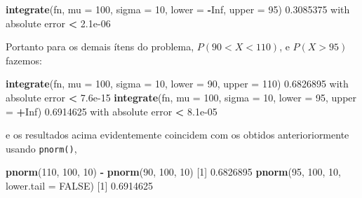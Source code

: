 \documentclass[10pt,a4paper]{book}
\newenvironment{Shaded}{\begin{snugshade}}{\end{snugshade}}
\newcommand{\KeywordTok}[1]{\textcolor[rgb]{0.13,0.29,0.53}{\textbf{#1}}}
\newcommand{\DataTypeTok}[1]{\textcolor[rgb]{0.13,0.29,0.53}{#1}}
\newcommand{\DecValTok}[1]{\textcolor[rgb]{0.00,0.00,0.81}{#1}}
\newcommand{\FloatTok}[1]{\textcolor[rgb]{0.00,0.00,0.81}{#1}}
\newcommand{\StringTok}[1]{\textcolor[rgb]{0.31,0.60,0.02}{#1}}
\newcommand{\OtherTok}[1]{\textcolor[rgb]{0.56,0.35,0.01}{#1}}
\newcommand{\OperatorTok}[1]{\textcolor[rgb]{0.81,0.36,0.00}{\textbf{#1}}}
\newcommand{\NormalTok}[1]{#1}
\begin{document}
\begin{Shaded}
\begin{Highlighting}[]
\KeywordTok{integrate}\NormalTok{(fn, }\DataTypeTok{mu =} \DecValTok{100}\NormalTok{, }\DataTypeTok{sigma =} \DecValTok{10}\NormalTok{, }\DataTypeTok{lower =} \OperatorTok{-}\OtherTok{Inf}\NormalTok{, }\DataTypeTok{upper =} \DecValTok{95}\NormalTok{)}
\FloatTok{0.3085375}\NormalTok{ with absolute error }\OperatorTok{<}\StringTok{ }\FloatTok{2.1e-06}
\end{Highlighting}
\end{Shaded}

Portanto para os demais ítens do problema, \(P(90 < X < 110)\), e
\(P(X > 95)\) fazemos:

\begin{Shaded}
\begin{Highlighting}[]
\KeywordTok{integrate}\NormalTok{(fn, }\DataTypeTok{mu =} \DecValTok{100}\NormalTok{, }\DataTypeTok{sigma =} \DecValTok{10}\NormalTok{, }\DataTypeTok{lower =} \DecValTok{90}\NormalTok{, }\DataTypeTok{upper =} \DecValTok{110}\NormalTok{)}
\FloatTok{0.6826895}\NormalTok{ with absolute error }\OperatorTok{<}\StringTok{ }\FloatTok{7.6e-15}
\KeywordTok{integrate}\NormalTok{(fn, }\DataTypeTok{mu =} \DecValTok{100}\NormalTok{, }\DataTypeTok{sigma =} \DecValTok{10}\NormalTok{, }\DataTypeTok{lower =} \DecValTok{95}\NormalTok{, }\DataTypeTok{upper =} \OperatorTok{+}\OtherTok{Inf}\NormalTok{)}
\FloatTok{0.6914625}\NormalTok{ with absolute error }\OperatorTok{<}\StringTok{ }\FloatTok{8.1e-05}
\end{Highlighting}
\end{Shaded}

e os resultados acima evidentemente coincidem com os obtidos
anterioriormente usando \texttt{pnorm()},

\begin{Shaded}
\begin{Highlighting}[]
\KeywordTok{pnorm}\NormalTok{(}\DecValTok{110}\NormalTok{, }\DecValTok{100}\NormalTok{, }\DecValTok{10}\NormalTok{) }\OperatorTok{-}\StringTok{ }\KeywordTok{pnorm}\NormalTok{(}\DecValTok{90}\NormalTok{, }\DecValTok{100}\NormalTok{, }\DecValTok{10}\NormalTok{)}
\NormalTok{[}\DecValTok{1}\NormalTok{] }\FloatTok{0.6826895}
\KeywordTok{pnorm}\NormalTok{(}\DecValTok{95}\NormalTok{, }\DecValTok{100}\NormalTok{, }\DecValTok{10}\NormalTok{, }\DataTypeTok{lower.tail =} \OtherTok{FALSE}\NormalTok{)}
\NormalTok{[}\DecValTok{1}\NormalTok{] }\FloatTok{0.6914625}
\end{Highlighting}
\end{Shaded}
\end{document}
